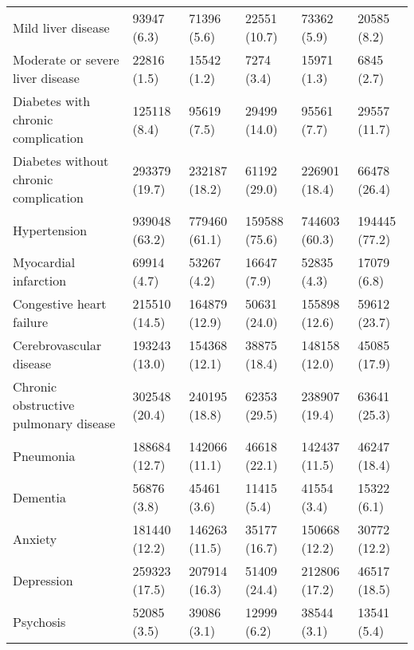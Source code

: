 \begin{adjustbox}{width={\textwidth},totalheight={\textheight},keepaspectratio,frame,padding=0ex 0ex -910ex 0ex}
{\begin{tabular}{L{20em}C{10em}C{10em}C{10em}C{10em}C{10em}}
\hspace{3mm} Mild liver disease & 93947 (6.3) & 71396 (5.6) & 22551 (10.7) & 73362 (5.9) & 20585 (8.2)\\
\hspace{3mm} Moderate or severe liver disease & 22816 (1.5) & 15542 (1.2) & 7274 (3.4) & 15971 (1.3) & 6845 (2.7)\\
\hspace{3mm} Diabetes with chronic complication & 125118 (8.4) & 95619 (7.5) & 29499 (14.0) & 95561 (7.7) & 29557 (11.7)\\
\hspace{3mm} Diabetes without chronic complication & 293379 (19.7) & 232187 (18.2) & 61192 (29.0) & 226901 (18.4) & 66478 (26.4)\\
\hspace{3mm} Hypertension & 939048 (63.2) & 779460 (61.1) & 159588 (75.6) & 744603 (60.3) & 194445 (77.2)\\
\hspace{3mm} Myocardial infarction & 69914 (4.7) & 53267 (4.2) & 16647 (7.9) & 52835 (4.3) & 17079 (6.8)\\
\hspace{3mm} Congestive heart failure & 215510 (14.5) & 164879 (12.9) & 50631 (24.0) & 155898 (12.6) & 59612 (23.7)\\
\hspace{3mm} Cerebrovascular disease & 193243 (13.0) & 154368 (12.1) & 38875 (18.4) & 148158 (12.0) & 45085 (17.9)\\
\hspace{3mm} Chronic obstructive pulmonary disease  & 302548 (20.4) & 240195 (18.8) & 62353 (29.5) & 238907 (19.4) & 63641 (25.3)\\
\hspace{3mm} Pneumonia & 188684 (12.7) & 142066 (11.1) & 46618 (22.1) & 142437 (11.5) & 46247 (18.4)\\
\hspace{3mm} Dementia & 56876 (3.8) & 45461 (3.6) & 11415 (5.4) & 41554 (3.4) & 15322 (6.1)\\
\hspace{3mm} Anxiety & 181440 (12.2) & 146263 (11.5) & 35177 (16.7) & 150668 (12.2) & 30772 (12.2)\\
\hspace{3mm} Depression & 259323 (17.5) & 207914 (16.3) & 51409 (24.4) & 212806 (17.2) & 46517 (18.5)\\
\hspace{3mm} Psychosis & 52085 (3.5) & 39086 (3.1) & 12999 (6.2) & 38544 (3.1) & 13541 (5.4)\\

\end{tabular}}
\end{adjustbox}
